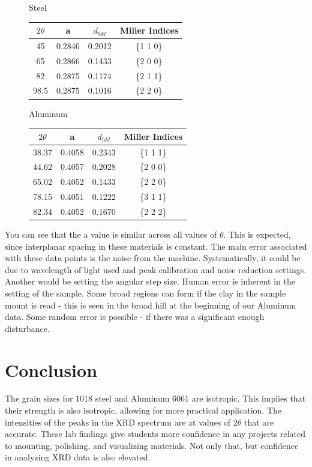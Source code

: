 \documentclass{article}
\begin{document}
\begin{figure}[h]
	\begin{minipage}{0.5\textwidth}
		\centering
		Steel
		
		\begin{tabular}{|| c | c | c | c ||}
		 \hline
		 $2\theta$ & a & $d_{hkl}$ & Miller Indices\\
		 \hline
		 \hline
		 45 & 0.2846 & 0.2012 & \{1 1 0\}\\
		 \hline
		 65 & 0.2866 & 0.1433 & \{2 0 0\}\\
		 \hline
		 82 & 0.2875 & 0.1174 & \{2 1 1\}\\
		 \hline
		 98.5 & 0.2875 & 0.1016 & \{2 2 0\}\\
		 \hline
		\end{tabular}
	\end{minipage}
	\begin{minipage}{0.5\textwidth}
		\centering
		Aluminum
		
		\begin{tabular}{|| c | c | c | c ||}
		 \hline
		 $2\theta$ & a & $d_{hkl}$ & Miller Indices\\
		 \hline
		 \hline
		 38.37 & 0.4058 & 0.2343 & \{1 1 1\}\\
		 \hline
		 44.62 & 0.4057 & 0.2028 & \{2 0 0\}\\
		 \hline
		 65.02 & 0.4052 & 0.1433 & \{2 2 0\}\\
		 \hline
		 78.15 & 0.4051 & 0.1222 & \{3 1 1\}\\
		 \hline
		 82.34 & 0.4052 & 0.1670 & \{2 2 2\}\\
		 \hline
		\end{tabular}
	\end{minipage}
\end{figure}

You can see that the a value is similar across all values of $\theta$. This is expected, since interplanar spacing in these materials is constant. The main error associated with these data points is the noise from the machine. Systematically, it could be due to wavelength of light used and peak calibration and noise reduction settings. Another would be setting the angular step size. Human error is inherent in the setting of the sample. Some broad regions can form if the clay in the sample mount is read - this is seen in the broad hill at the beginning of our Aluminum data. Some random error is possible - if there was a significant enough disturbance.

\section{Conclusion}

The grain sizes for 1018 steel and Aluminum 6061 are isotropic. This implies that their strength is also isotropic, allowing for more practical application. The intensities of the peaks in the XRD spectrum are at values of 2$\theta$ that are accurate. These lab findings give students more confidence in any projects related to mounting, polishing, and visualizing materials. Not only that, but confidence in analyzing XRD data is also elevated.
\end{document}

